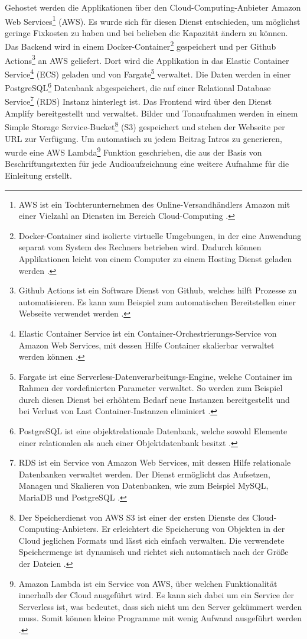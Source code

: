 Gehostet werden die Applikationen über den Cloud-Computing-Anbieter Amazon Web Services\footnote{AWS ist ein Tochterunternehmen des Online-Versandhändlers Amazon mit einer Vielzahl an Diensten im Bereich Cloud-Computing \parencite{amazon_homepage}.} (AWS). Es wurde sich für diesen Dienst entschieden, um möglichst geringe Fixkosten zu haben und bei belieben die Kapazität ändern zu können. Das Backend wird in einem Docker-Container\footnote{Docker-Container sind isolierte virtuelle Umgebungen, in der eine Anwendung separat vom System des Rechners betrieben wird. Dadurch können Applikationen leicht von einem Computer zu einem Hosting Dienst geladen werden \parencite{docker_container}.} gespeichert und per Github Actions\footnote{Github Actions ist ein Software Dienst von Github, welches hilft Prozesse zu automatisieren. Es kann zum Beispiel zum automatischen Bereitstellen einer Webseite verwendet werden \parencite{github_actions}.} an AWS geliefert. Dort wird die Applikation in das Elastic Container Service\footnote{Elastic Container Service ist ein Container-Orchestrierungs-Service von Amazon Web Services, mit dessen Hilfe Container skalierbar verwaltet werden können \parencite{aws_ecs}.} (ECS) geladen und von Fargate\footnote{Fargate ist eine Serverless-Datenverarbeitungs-Engine, welche Container im Rahmen der vordefinierten Parameter verwaltet. So werden zum Beispiel durch diesen Dienst bei erhöhtem Bedarf neue Instanzen bereitgestellt und bei Verlust von Last Container-Instanzen eliminiert \parencite{aws_fargate}.} verwaltet. Die Daten werden in einer PostgreSQL\footnote{PostgreSQL ist eine objektrelationale Datenbank, welche sowohl Elemente einer relationalen als auch einer Objektdatenbank besitzt \parencite{postgresql}.} Datenbank abgespeichert, die auf einer Relational Database Service\footnote{RDS ist ein Service von Amazon Web Services, mit dessen Hilfe relationale Datenbanken verwaltet werden. Der Dienst ermöglicht das Aufsetzen, Managen und Skalieren von Datenbanken, wie zum Beispiel MySQL, MariaDB und PostgreSQL \parencite[vlg.][S.161 f.]{baron_aws_2016}.} (RDS) Instanz hinterlegt ist. Das Frontend wird über den Dienst Amplify \parencite{aws_amplify} bereitgestellt und verwaltet. Bilder und Tonaufnahmen werden in einem Simple Storage Service-Bucket\footnote{Der Speicherdienst von AWS S3 ist einer der ersten Dienste des Cloud-Computing-Anbieters. Er erleichtert die Speicherung von Objekten in der Cloud jeglichen Formats und lässt sich einfach verwalten. Die verwendete Speichermenge ist dynamisch und richtet sich automatisch nach der Größe der Dateien \parencite[vlg.][S. 23]{baron_aws_2016}.} (S3) gespeichert und stehen der Webseite per URL zur Verfügung. Um automatisch zu jedem Beitrag Intros zu generieren, wurde eine AWS Lambda\footnote{Amazon Lambda ist ein Service von AWS, über welchen Funktionalität innerhalb der Cloud ausgeführt wird. Es kann sich dabei um ein Service der Serverless ist, was bedeutet, dass sich nicht um den Server gekümmert werden muss. Somit können kleine Programme mit wenig Aufwand ausgeführt werden \parencites[vlg.][Kap. 15.3]{wolff_microservices_2018}{aws_lambda}.} Funktion geschrieben, die aus der Basis von Beschriftungstexten für jede Audioaufzeichnung eine weitere Aufnahme für die Einleitung erstellt.

